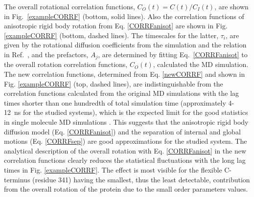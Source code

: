 \documentclass[pre,aps,floatfix,authordate1-4,twocolumn]{revtex4-1}
\begin{document}
The overall rotational correlation functions, $C_O(t)=C(t)/C_I(t)$,
are shown in Fig.~\ref{exampleCORRF} (bottom, solid lines).
Also the correlation functions of anisotropic rigid body rotation
from Eq. \ref{CORRFanisot} are shown in Fig. \ref{exampleCORRF} (bottom, dashed lines).
The timescales for the latter, $\tau_i$, are given by the rotational
diffusion coefficients from the simulation and the relation
in Ref.~, and the prefactors, $A_j$, are determined by fitting
Eq.~\ref{CORRFanisot} to the overall rotation correlation functions, $C_O(t)$, calculated the MD simulation.
The new correlation functions, determined from Eq. \ref{newCORRF} and
shown in Fig. \ref{exampleCORRF} (top, dashed lines),
are indistinguishable from the correlation functions calculated from
the original MD simulations with the lag times shorter than one
hundredth of total simulation time (approximately 4-12~ns for the studied systems),
which is the expected limit for the good statistics in single molecule MD simulations \cite{lu06}.
This suggests that the anisotropic rigid body diffusion model (Eq. \ref{CORRFanisot}) and
the separation of internal and global motions (Eq. \ref{CORRFsep}) are
good approximations for the studied system.
The analytical description of the overall rotation with Eq. \ref{CORRFanisot}
in the new correlation functions
clearly reduces the statistical fluctuations with the long lag times in Fig. \ref{exampleCORRF}.
The effect is most visible for the flexible C-terminus (residue 341) having
the smallest, thus the least detectable, contribution from the
overall rotation of the protein due to the small order parameters values.


\end{document}
